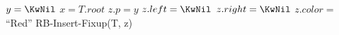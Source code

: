 \documentclass{subfiles}
\begin{document}
    \begin{procedure}
        \caption{RB-Insert(T, z)}\label{proc:RB-insertion}
        $ y = \KwNil $ \;\DontPrintSemicolon
        $ x = T.root $ \;\DontPrintSemicolon
        $ z.p = y $ \;\DontPrintSemicolon
        $ z.left = \KwNil $ \;\DontPrintSemicolon
        $ z.right = \KwNil $ \;\DontPrintSemicolon
        $ z.color = $ ``Red'' \;\DontPrintSemicolon
        RB-Insert-Fixup(T, z)
    \end{procedure}
\end{document}

